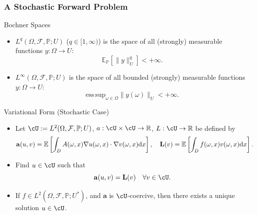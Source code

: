 \documentclass[aspectratio=169,xcolor=dvipsnames,10pt]{beamer}
\newcommand{\bbp}{\mathbb{P}}
\newcommand{\cF}{\mathcal{F}}
\begin{document}
\begin{frame}\frametitle{A Stochastic Forward Problem}
\vspace{-1ex}
\begin{block}{Bochner Spaces}
\begin{itemize}
\item $L^{q}(\Omega,\cF,\bbp; U)$ ($q \in [1,\infty)$) is the space of all (strongly) measurable functions $y : \Omega \to U$:
\[
\mathbb E_{\bbp}[ \| y \|^{q}_{U} ] < +\infty.  
\]
\item $L^{\infty}(\Omega,\cF,\bbp; U)$  is the space of all bounded (strongly) measurable functions $y : \Omega \to U$:
\[
\mathrm{ess\, sup}_{\omega \in \Omega}\| y(\omega) \|_{U}  < +\infty.  
\]
\end{itemize}
\end{block}\pause\vspace{-1ex}
\begin{block}{Variational Form (Stochastic Case)}
\begin{itemize}
\item Let $\cU := L^2(\Omega,\cF,\bbp; U)$, $a : \cU \times \cU \to \mathbb R$, $L : \cU \to \mathbb R$ be defined by
\[
\aligned
\mathbf{a}(u,v) 
&= \mathbb E\left[  \int_{D} A(\omega,x) \nabla u(\omega,x) \cdot \nabla v(\omega,x) \mathrm{d}x \right],\quad
\mathbf{L}(v)
=
\mathbb E\left[  \int_{D} f(\omega,x) v(\omega,x) \mathrm{d}x \right].
\endaligned
\] 
\item Find $u \in \cU$ such that
\begin{equation}\label{eq:weak_stoch}
\mathbf{a}(u,v)  = \mathbf{L}(v) \quad \forall v \in \cU.
\end{equation}
\item If $f \in L^2(\Omega,\cF,\mathbb P; U^*)$, and $\mathbf{a}$ is $\cU$-coercive, then there exists a unique solution $u \in \cU$.
\end{itemize}
\end{block}
\end{frame}
\end{document}
